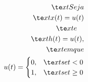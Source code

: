 \documentclass[preview]{standalone}
\begin{document}
\begin{align*}
\te x t{Seja } \\ \te x t{ x (t)} = u(t) \\ \te x t{ e } \quad \\ \te x t{ h (t)} = u(t),\\ \te x t{ em que } \\ u(t) = \begin{cases} 0, & \te x t{se } t < 0 \\ 1, & \te x t{se } t \geq 0 \end{cases}
\end{align*}
\end{document}
